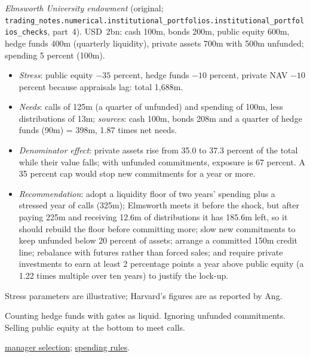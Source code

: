 \begin{qfmethod}
 \emph{Elmsworth University endowment} (original; \nolinkurl{trading_notes.numerical.institutional_portfolios.institutional_portfolios_checks}, part~4). USD~2bn: cash 100m, bonds 200m, public equity 600m, hedge funds 400m (quarterly liquidity), private assets 700m with 500m unfunded; spending 5 percent (100m).
\begin{itemize}
\item \emph{Stress}: public equity $-35$ percent, hedge funds $-10$ percent, private NAV $-10$ percent because appraisals lag: total 1,688m.
\item \emph{Needs}: calls of 125m (a quarter of unfunded) and spending of 100m, less distributions of 13m; \emph{sources}: cash 100m, bonds 208m and a quarter of hedge funds (90m) = 398m, 1.87 times net needs.
\item \emph{Denominator effect}: private assets rise from 35.0 to 37.3 percent of the total while their value falls; with unfunded commitments, exposure is 67 percent. A 35 percent cap would stop new commitments for a year or more.
\item \emph{Recommendation}: adopt a liquidity floor of two years' spending plus a stressed year of calls (325m); Elmsworth meets it before the shock, but after paying 225m and receiving 12.6m of distributions it has 185.6m left, so it should rebuild the floor before committing more; slow new commitments to keep unfunded below 20 percent of assets; arrange a committed 150m credit line; rebalance with futures rather than forced sales; and require private investments to earn at least 2 percentage points a year above public equity (a 1.22 times multiple over ten years) to justify the lock-up.
\end{itemize}

 Stress parameters are illustrative; Harvard's figures are as reported by Ang.

 Counting hedge funds with gates as liquid. Ignoring unfunded commitments. Selling public equity at the bottom to meet calls.

 \hyperref[meth:standards-in-manager-selection]{manager selection}; \hyperref[meth:institutional-ips-portfolios]{spending rules}.

\end{qfmethod}
